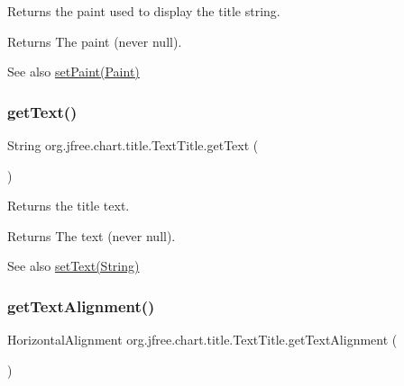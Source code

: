 Returns the paint used to display the title string.

\begin{DoxyReturn}{Returns}
The paint (never {\ttfamily null}).
\end{DoxyReturn}
\begin{DoxySeeAlso}{See also}
\mbox{\hyperlink{classorg_1_1jfree_1_1chart_1_1title_1_1_text_title_aabe0fdb633a983b1236433c4fd60dd3f}{set\+Paint(\+Paint)}} 
\end{DoxySeeAlso}
\mbox{\label{classorg_1_1jfree_1_1chart_1_1title_1_1_text_title_abef1d4aca056ced7cb1af6da5ea2f322}} 
\subsubsection{\texorpdfstring{get\+Text()}{getText()}}
{\footnotesize\ttfamily String org.\+jfree.\+chart.\+title.\+Text\+Title.\+get\+Text (\begin{DoxyParamCaption}{ }\end{DoxyParamCaption})}

Returns the title text.

\begin{DoxyReturn}{Returns}
The text (never {\ttfamily null}).
\end{DoxyReturn}
\begin{DoxySeeAlso}{See also}
\mbox{\hyperlink{classorg_1_1jfree_1_1chart_1_1title_1_1_text_title_a785cbdf64eec81ca253a3767c415547c}{set\+Text(\+String)}} 
\end{DoxySeeAlso}
\mbox{\label{classorg_1_1jfree_1_1chart_1_1title_1_1_text_title_a4389bb8e5461cc851031419eef9a8323}} 
\subsubsection{\texorpdfstring{get\+Text\+Alignment()}{getTextAlignment()}}
{\footnotesize\ttfamily Horizontal\+Alignment org.\+jfree.\+chart.\+title.\+Text\+Title.\+get\+Text\+Alignment (\begin{DoxyParamCaption}{ }\end{DoxyParamCaption})}


